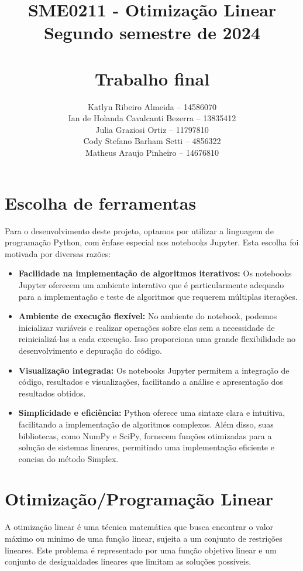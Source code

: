 \documentclass{article}
\title{SME0211 - Otimização Linear\\
Segundo semestre de 2024\\ 

\textbf{\\Trabalho final}}
\author{
Katlyn Ribeiro Almeida -- 14586070\\
Ian de Holanda Cavalcanti Bezerra -- 13835412 \\
Julia Graziosi Ortiz -- 11797810\\
Cody Stefano Barham Setti -- 4856322\\
Matheus Araujo Pinheiro -- 14676810
}
\begin{document}
\maketitle
\section{Escolha de ferramentas}

Para o desenvolvimento deste projeto, optamos por utilizar a linguagem de programação Python, com ênfase especial nos notebooks Jupyter. Esta escolha foi motivada por diversas razões:

\begin{itemize}
    \item \textbf{Facilidade na implementação de algoritmos iterativos:} Os notebooks Jupyter oferecem um ambiente interativo que é particularmente adequado para a implementação e teste de algoritmos que requerem múltiplas iterações.
    
    \item \textbf{Ambiente de execução flexível:} No ambiente do notebook, podemos inicializar variáveis e realizar operações sobre elas sem a necessidade de reinicializá-las a cada execução. Isso proporciona uma grande flexibilidade no desenvolvimento e depuração do código.
    
    \item \textbf{Visualização integrada:} Os notebooks Jupyter permitem a integração de código, resultados e visualizações, facilitando a análise e apresentação dos resultados obtidos.
    
    \item \textbf{Simplicidade e eficiência:} Python oferece uma sintaxe clara e intuitiva, facilitando a implementação de algoritmos complexos. Além disso, suas bibliotecas, como NumPy e SciPy, fornecem funções otimizadas para a solução de sistemas lineares, permitindo uma implementação eficiente e concisa do método Simplex.
\end{itemize}


\section{Otimização/Programação Linear}

A otimização linear é uma técnica matemática que busca encontrar o valor máximo ou mínimo de uma função linear, sujeita a um conjunto de restrições lineares. Este problema é representado por uma função objetivo linear e um conjunto de desigualdades lineares que limitam as soluções possíveis.
\end{document}
